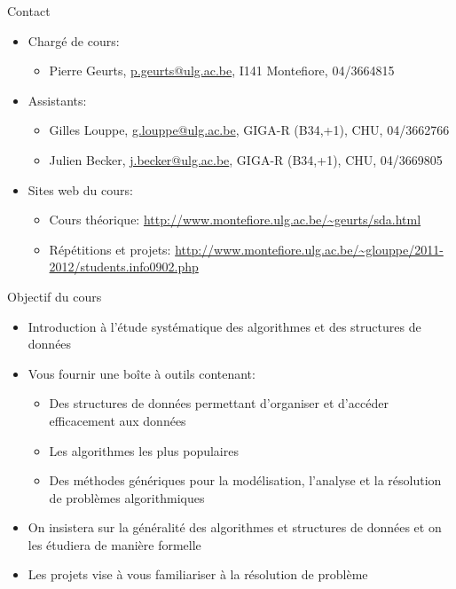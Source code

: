 
\begin{frame}{Contact}
\begin{itemize}
\item Chargé de cours: 
\begin{itemize}
\item Pierre Geurts, \url{p.geurts@ulg.ac.be}, I141 Montefiore, 04/3664815
\end{itemize}
\item Assistants:
\begin{itemize}
\item Gilles Louppe, \url{g.louppe@ulg.ac.be}, GIGA-R (B34,+1), CHU, 04/3662766
\item Julien Becker, \url{j.becker@ulg.ac.be}, GIGA-R (B34,+1), CHU, 04/3669805
\end{itemize}
\item Sites web du cours:
\begin{itemize}
\item Cours théorique: \url{http://www.montefiore.ulg.ac.be/~geurts/sda.html}
\item Répétitions et projets: \url{http://www.montefiore.ulg.ac.be/~glouppe/2011-2012/students.info0902.php}
\end{itemize}
\end{itemize}
\end{frame}

\begin{frame}{Objectif du cours}

\begin{itemize}
\item Introduction à l'étude systématique des algorithmes et des
  structures de données
\item Vous fournir une boîte à outils contenant:
\begin{itemize}
\item Des structures de données permettant d'organiser et d'accéder efficacement
  aux données
\item Les algorithmes les plus populaires
\item Des méthodes génériques pour la modélisation, l'analyse et la résolution de problèmes algorithmiques
\end{itemize}
\item On insistera sur la généralité des algorithmes et structures de données et on les étudiera de manière formelle
\item Les projets vise à vous familiariser à la résolution de problème
\end{itemize}

\end{frame}

